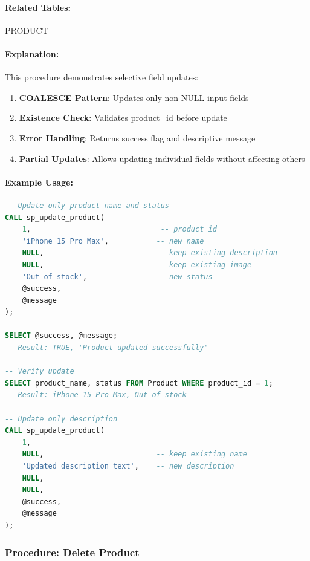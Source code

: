 \paragraph{Related Tables:} PRODUCT

\paragraph{Explanation:}
This procedure demonstrates selective field updates:
\begin{enumerate}
    \item \textbf{COALESCE Pattern}: Updates only non-NULL input fields
    \item \textbf{Existence Check}: Validates product\_id before update
    \item \textbf{Error Handling}: Returns success flag and descriptive message
    \item \textbf{Partial Updates}: Allows updating individual fields without affecting others
\end{enumerate}

\paragraph{Example Usage:}

\begin{lstlisting}[language=SQL]
-- Update only product name and status
CALL sp_update_product(
    1,                              -- product_id
    'iPhone 15 Pro Max',           -- new name
    NULL,                          -- keep existing description
    NULL,                          -- keep existing image
    'Out of stock',                -- new status
    @success,
    @message
);

SELECT @success, @message;
-- Result: TRUE, 'Product updated successfully'

-- Verify update
SELECT product_name, status FROM Product WHERE product_id = 1;
-- Result: iPhone 15 Pro Max, Out of stock

-- Update only description
CALL sp_update_product(
    1,
    NULL,                          -- keep existing name
    'Updated description text',    -- new description
    NULL,
    NULL,
    @success,
    @message
);
\end{lstlisting}

\subsubsection{Procedure: Delete Product}

